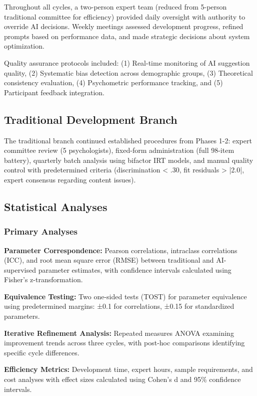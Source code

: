 \documentclass[12pt,a4paper]{article}
\begin{document}
Throughout all cycles, a two-person expert team (reduced from 5-person traditional committee for efficiency) provided daily oversight with authority to override AI decisions. Weekly meetings assessed development progress, refined prompts based on performance data, and made strategic decisions about system optimization.

Quality assurance protocols included: (1) Real-time monitoring of AI suggestion quality, (2) Systematic bias detection across demographic groups, (3) Theoretical consistency evaluation, (4) Psychometric performance tracking, and (5) Participant feedback integration.

\subsection{Traditional Development Branch}

The traditional branch continued established procedures from Phases 1-2: expert committee review (5 psychologists), fixed-form administration (full 98-item battery), quarterly batch analysis using bifactor IRT models, and manual quality control with predetermined criteria (discrimination < .30, fit residuals > |2.0|, expert consensus regarding content issues).

\subsection{Statistical Analyses}

\subsubsection{Primary Analyses}

\textbf{Parameter Correspondence:} Pearson correlations, intraclass correlations (ICC), and root mean square error (RMSE) between traditional and AI-supervised parameter estimates, with confidence intervals calculated using Fisher's z-transformation.

\textbf{Equivalence Testing:} Two one-sided tests (TOST) for parameter equivalence using predetermined margins: ±0.1 for correlations, ±0.15 for standardized parameters.

\textbf{Iterative Refinement Analysis:} Repeated measures ANOVA examining improvement trends across three cycles, with post-hoc comparisons identifying specific cycle differences.

\textbf{Efficiency Metrics:} Development time, expert hours, sample requirements, and cost analyses with effect sizes calculated using Cohen's d and 95\% confidence intervals.
\end{document}
